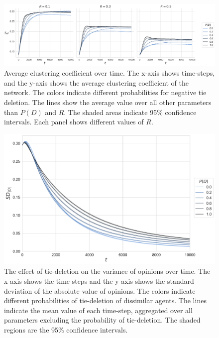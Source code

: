 \documentclass[11pt]{article}
\begin{document}
\begin{figure}[H]
    \centering
    \includegraphics[width=.9\linewidth]{../plots/overall/Average_Clustering_Coefficient_Ties_Deleted.png}
  \caption{Average clustering coefficient over time. The x-axis shows time-steps, and the y-axis shows the average clustering coefficient of the network. The colors indicate different probabilities for negative tie deletion. The lines show the average value over all other parameters than $P(D)$ and $R$. The shaded areas indicate 95\% confidence intervals. Each panel shows different values of $R$.}
  \label{appendix:clustering}
\end{figure}

\begin{figure}[H]
    \centering
    \includegraphics[width=.9\linewidth]{../plots/overall/Standard_Deviation_Absolute_Opinion_Tie_Deletion.png}
  \caption{The effect of tie-deletion on the variance of opinions over time. The x-axis shows the time-steps and the y-axis shows the standard deviation of the absolute value of opinions. The colors indicate different probabilities of tie-deletion of dissimilar agents. The lines indicate the mean value of each time-step, aggregated over all parameters excluding the probability of tie-deletion. The shaded regions are the 95\% confidence intervals. }
  \label{appendix:pd_sd}
\end{figure}
\end{document}
